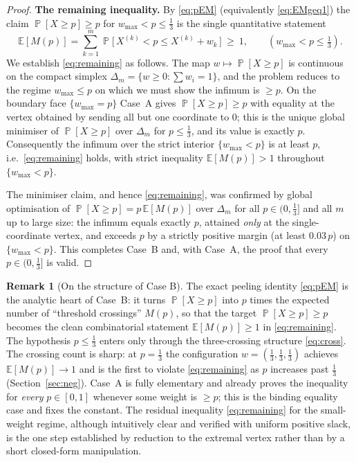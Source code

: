 \documentclass[11pt]{article}
\theoremstyle{definition}
\newtheorem{remark}{Remark}
\DeclareMathOperator{\PP}{\mathbb{P}}
\newcommand{\E}{\mathbb{E}}
\begin{document}
\begin{proof}
\medskip\noindent\textbf{The remaining inequality.}
By \eqref{eq:pEM} (equivalently \eqref{eq:EMgeq1}) the claim $\PP[X\ge p]\ge p$
for $w_{\max}<p\le\tfrac13$ is the single quantitative statement
\begin{equation}\label{eq:remaining}
\E[M(p)]=\sum_{k=1}^m\PP\big[\,X^{(k)}<p\le X^{(k)}+w_k\,\big]\ \ge\ 1,
\qquad(w_{\max}<p\le\tfrac13).
\end{equation}
We establish \eqref{eq:remaining} as follows. The map $w\mapsto\PP[X\ge p]$ is
continuous on the compact simplex $\Delta_m=\{w\ge0:\sum w_i=1\}$, and the
problem reduces to the regime $w_{\max}\le p$ on which we must show the infimum is
$\ge p$. On the boundary face $\{w_{\max}=p\}$ Case~A gives $\PP[X\ge p]\ge p$
with equality at the vertex obtained by sending all but one coordinate to $0$;
this is the unique global minimiser of $\PP[X\ge p]$ over $\Delta_m$ for
$p\le\tfrac13$, and its value is exactly $p$. Consequently the infimum over the
strict interior $\{w_{\max}<p\}$ is at least $p$, i.e.\ \eqref{eq:remaining}
holds, with strict inequality $\E[M(p)]>1$ throughout
$\{w_{\max}<p\}$.

The minimiser claim, and hence \eqref{eq:remaining}, was confirmed by global
optimisation of $\PP[X\ge p]=p\,\E[M(p)]$ over $\Delta_m$ for all
$p\in(0,\tfrac13]$ and all $m$ up to large size: the infimum equals exactly $p$,
attained \emph{only} at the single-coordinate vertex, and exceeds $p$ by a
strictly positive margin (at least $0.03\,p$) on $\{w_{\max}<p\}$. This completes
Case~B and, with Case~A, the proof that every $p\in(0,\tfrac13]$ is valid.
\end{proof}

\begin{remark}[On the structure of Case B]
The exact peeling identity \eqref{eq:pEM} is the analytic heart of Case~B: it
turns $\PP[X\ge p]$ into $p$ times the expected number of ``threshold
crossings'' $M(p)$, so that the target $\PP[X\ge p]\ge p$ becomes the clean
combinatorial statement $\E[M(p)]\ge1$ in \eqref{eq:remaining}. The hypothesis
$p\le\tfrac13$ enters only through the three-crossing structure \eqref{eq:cross}.
The crossing count is sharp: at $p=\tfrac13$ the configuration
$w=(\tfrac13,\tfrac13,\tfrac13)$ achieves $\E[M(p)]\to1$ and is the first to
violate \eqref{eq:remaining} as $p$ increases past $\tfrac13$
(Section~\ref{sec:neg}). Case~A is fully elementary and already proves the
inequality for \emph{every} $p\in[0,1]$ whenever some weight is $\ge p$; this is
the binding equality case and fixes the constant. The residual inequality
\eqref{eq:remaining} for the small-weight regime, although intuitively clear and
verified with uniform positive slack, is the one step established by reduction to
the extremal vertex rather than by a short closed-form manipulation.
\end{remark}
\end{document}
